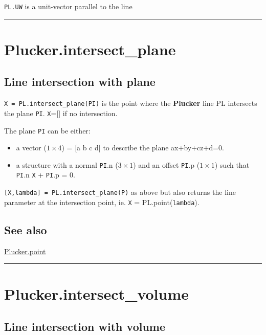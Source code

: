 \texttt{PL.UW} is a unit-vector parallel to the line

\vspace{1.5ex}\hrule

\hypertarget{Plucker.intersect\_plane}{\section*{Plucker.intersect\_plane}}
\subsection*{Line intersection with plane}


\texttt{X = PL.intersect\_plane(PI)} is the point where the \textbf{\color{red} Plucker} line PL
intersects the plane \texttt{PI}.  \texttt{X}=[] if no intersection.



The plane \texttt{PI} can be either:

\begin{itemize}
  \item a vector ($1 \times 4$) = [a b c d] to describe the plane ax+by+cz+d=0.
  \item a structure with a normal \texttt{PI}.n ($3 \times 1$) and an offset \texttt{PI}.p     ($1 \times 1$) such that \texttt{PI}.n \texttt{X} + \texttt{PI}.p = 0.
\end{itemize}


\texttt{[X,lambda] = PL.intersect\_plane(P)} as above but also returns the
line parameter at the intersection point, ie. \texttt{X} = PL.point(\texttt{lambda}).


\subsection*{See also}


\hyperlink{Plucker.point}{\color{blue} Plucker.point}

\vspace{1.5ex}\hrule

\hypertarget{Plucker.intersect\_volume}{\section*{Plucker.intersect\_volume}}
\subsection*{Line intersection with volume}


